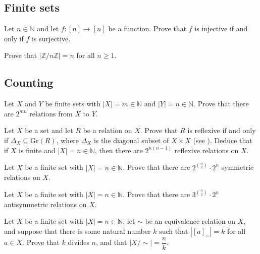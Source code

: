 \subsection*{Finite sets}

\begin{chapex}
Let $n \in \mathbb{N}$ and let $f : [n] \to [n]$ be a function. Prove that $f$ is injective if and only if $f$ is surjective.
\end{chapex}

\begin{chapex}
Prove that $|\mathbb{Z}/n\mathbb{Z}|=n$ for all $n \ge 1$.
\end{chapex}

\subsection*{Counting}

\begin{chapex}
Let $X$ and $Y$ be finite sets with $|X|=m \in \mathbb{N}$ and $|Y|=n \in \mathbb{N}$. Prove that there are $2^{mn}$ relations from $X$ to $Y$.
\end{chapex}

\begin{chapex}
Let $X$ be a set and let $R$ be a relation on $X$. Prove that $R$ is reflexive if and only if $\Delta_X \subseteq \mathrm{Gr}(R)$, where $\Delta_X$ is the diagonal subset of $X \times X$ (see ). Deduce that if $X$ is finite and $|X|=n \in \mathbb{N}$, then there are $2^{n(n-1)}$ reflexive relations on $X$.
\end{chapex}

\begin{chapex}
Let $X$ be a finite set with $|X|=n \in \mathbb{N}$. Prove that there are $2^{\binom{n}{2}} \cdot 2^n$ symmetric relations on $X$.
\end{chapex}

\begin{chapex}
Let $X$ be a finite set with $|X|=n \in \mathbb{N}$. Prove that there are $3^{\binom{n}{2}} \cdot 2^n$ antisymmetric relations on $X$.
\end{chapex}

\begin{chapex}
Let $X$ be a finite set with $|X| = n \in \mathbb{N}$, let $\sim$ be an equivalence relation on $X$, and suppose that there is some natural number $k$ such that $|[a]_{\sim}| = k$ for all $a \in X$. Prove that $k$ divides $n$, and that $|X/{\sim}| = \dfrac{n}{k}$.
\end{chapex}


